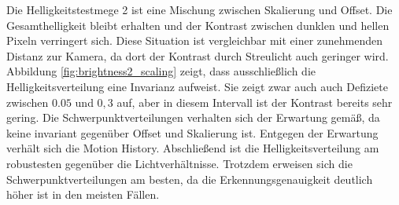 \newline
\newline
Die Helligkeitstestmege 2 ist eine Mischung zwischen Skalierung und Offset. Die Gesamthelligkeit bleibt erhalten und der Kontrast zwischen dunklen
und hellen Pixeln verringert sich. Diese Situation ist vergleichbar mit einer zunehmenden Distanz zur Kamera, da dort der Kontrast durch Streulicht auch geringer wird.
\newline
\newline
Abbildung \ref{fig:brightness2_scaling} zeigt, dass ausschließlich die Helligkeitsverteilung eine Invarianz aufweist. Sie zeigt zwar auch auch Defiziete zwischen $0.05$ und $0,3$ auf, aber in diesem
Intervall ist der Kontrast bereits sehr gering. Die Schwerpunktverteilungen verhalten sich der Erwartung gemäß, da keine invariant gegenüber Offset und Skalierung ist. Entgegen der Erwartung verhält
sich die Motion History.
\newline
\newline
Abschließend ist die Helligkeitsverteilung am robustesten gegenüber die Lichtverhältnisse. Trotzdem erweisen sich die Schwerpunktverteilungen am besten, da die Erkennungsgenauigkeit deutlich höher ist
in den meisten Fällen.